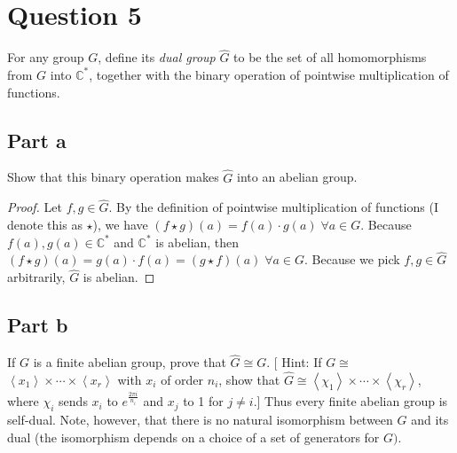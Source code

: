 \section{Question 5}

\begin{question}
    For any group $G$, define its \textit{dual group} $\hat{G}$ to be the set of all homomorphisms from $G$ into $\mathbb{C}^*$, together with the binary operation of pointwise multiplication of functions.
\end{question}

\subsection{Part a}

\begin{question}
    Show that this binary operation makes $\hat{G}$ into an abelian group.
\end{question}

\begin{answer}
    \begin{proof}
        Let $f,g \in \hat{G}$. By the definition of pointwise multiplication of functions (I denote this as $\star$), we have $(f\star g)(a) = f(a)\cdot g(a) \; \forall a \in G$. Because $f(a),g(a) \in \mathbb{C}^{*}$ and $\mathbb{C}^{*}$ is abelian, then $(f\star g)(a) = g(a) \cdot f(a) = (g \star f)(a) \; \forall a\in G$. Because we pick $f,g \in \hat{G}$ arbitrarily, $\hat{G}$ is abelian.
    \end{proof}
\end{answer}

\subsection{Part b}

\begin{question}
    If $G$ is a finite abelian group, prove that $\hat{G} \cong G$. $[$ Hint: If $G \cong$ $\left\langle x_1\right\rangle \times \cdots \times\left\langle x_r\right\rangle$ with $x_i$ of order $n_i$, show that $\hat{G} \cong\left\langle\chi_1\right\rangle \times \cdots \times\left\langle\chi_r\right\rangle$, where $\chi_i$ sends $x_i$ to $e^{\frac{2 \pi i}{n_i}}$ and $x_j$ to 1 for $j \neq i$.] Thus every finite abelian group is self-dual. Note, however, that there is no natural isomorphism between $G$ and its dual (the isomorphism depends on a choice of a set of generators for $G)$.
\end{question}

